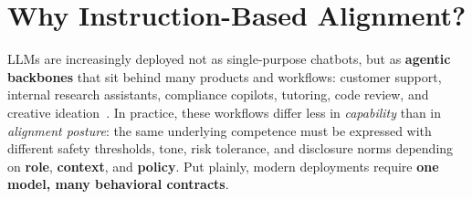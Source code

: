 
\vspace{-2.5em}
\section{Why Instruction-Based Alignment?}
\label{sec:introduction}
\vspace{-0.5em}

LLMs are increasingly deployed not as single-purpose chatbots, but as \textbf{agentic backbones} that sit behind many products and workflows: customer support, internal research assistants, compliance copilots, tutoring, code review, and creative ideation~\cite{brown2020language,openai2023gpt4,touvron2023llama}. In practice, these workflows differ less in \emph{capability} than in \emph{alignment posture}: the same underlying competence must be expressed with different safety thresholds, tone, risk tolerance, and disclosure norms depending on \textbf{role}, \textbf{context}, and \textbf{policy}. Put plainly, modern deployments require \textbf{one model, many behavioral contracts}.








%
%

